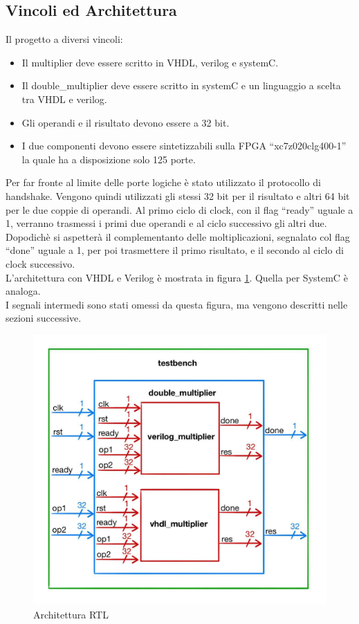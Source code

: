 \documentclass[]{IEEEtran}
\begin{document}
\subsection{Vincoli ed Architettura}
Il progetto a diversi vincoli:
\begin{itemize}
    \item Il multiplier deve essere scritto in VHDL, verilog e systemC.
    \item Il double\_multiplier deve essere scritto in systemC e un linguaggio a scelta tra VHDL e verilog.
    \item Gli operandi e il risultato devono essere a 32 bit.
    \item I due componenti devono essere sintetizzabili sulla FPGA ``xc7z020clg400-1'' la quale ha a disposizione solo 125 porte.
\end{itemize}
Per far fronte al limite delle porte logiche è stato utilizzato il protocollo di handshake. Vengono quindi utilizzati gli stessi 32 bit per il risultato e altri 64 bit per le due coppie di operandi. Al primo ciclo di clock, con il flag ``ready'' uguale a 1, verranno trasmessi i primi due operandi e al ciclo successivo gli altri due. Dopodichè si aspetterà il complementanto delle moltiplicazioni, segnalato col flag ``done'' uguale a 1, per poi trasmettere il primo risultato, e il secondo al ciclo di clock successivo.
\\L'architettura con VHDL e Verilog è mostrata in figura \ref{fig:Architettura}. Quella per SystemC è analoga. 
\\I segnali intermedi sono stati omessi da questa figura, ma vengono descritti nelle sezioni successive.
\begin{figure}[!htb]
    \centering
    \includegraphics[width=0.6\linewidth]{figures/architettura.jpg}
    \caption{Architettura RTL}
    \label{fig:Architettura}
\end{figure}
\end{document}
